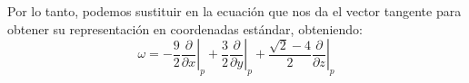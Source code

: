 \begin{example}
	Por lo tanto, podemos sustituir en la ecuación que nos da el vector tangente para obtener su representación en coordenadas estándar, obteniendo:
	\[ \omega =
		\left. -\frac{9}{2} \frac{\partial}{\partial x} \right|_p +
		\left. \frac{3}{2}\frac{\partial}{\partial y} \right|_p +
		\left. \frac{\sqrt{2} - 4}{2} \frac{\partial}{\partial z} \right|_p\]
\end{example}
